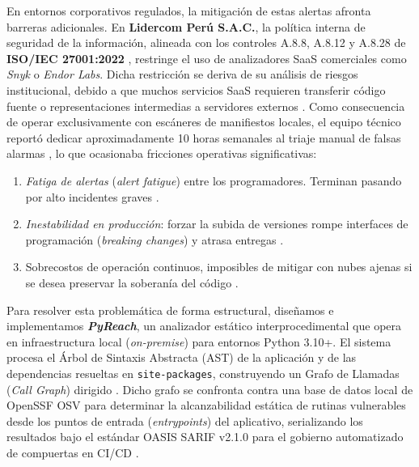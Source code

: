 \documentclass[conference]{IEEEtran}
\begin{document}
En entornos corporativos regulados, la mitigación de estas alertas afronta barreras adicionales. En \textbf{Lidercom Perú S.A.C.}, la política interna de seguridad de la información, alineada con los controles A.8.8, A.8.12 y A.8.28 de \textbf{ISO/IEC 27001:2022} \cite{iso2022sec, gutierrez2024auditoria}, restringe el uso de analizadores SaaS comerciales como \textit{Snyk} o \textit{Endor Labs}. Dicha restricción se deriva de su análisis de riesgos institucional, debido a que muchos servicios SaaS requieren transferir código fuente o representaciones intermedias a servidores externos \cite{ladisa2023sok, ohm2022sok}. Como consecuencia de operar exclusivamente con escáneres de manifiestos locales, el equipo técnico reportó dedicar aproximadamente 10 horas semanales al triaje manual de falsas alarmas \cite{sadowski2018lessons}, lo que ocasionaba fricciones operativas significativas:
\begin{enumerate}
    \item \textit{Fatiga de alertas} (\textit{alert fatigue}) entre los programadores. Terminan pasando por alto incidentes graves \cite{johnson2013developers}.
    \item \textit{Inestabilidad en producción}: forzar la subida de versiones rompe interfaces de programación (\textit{breaking changes}) y atrasa entregas \cite{bogart2016break, xavier2017historical}.
    \item Sobrecostos de operación continuos, imposibles de mitigar con nubes ajenas si se desea preservar la soberanía del código \cite{ladisa2023sok}.
\end{enumerate}

Para resolver esta problemática de forma estructural, diseñamos e implementamos \textbf{\textit{PyReach}}, un analizador estático interprocedimental que opera en infraestructura local (\textit{on-premise}) para entornos Python 3.10+. El sistema procesa el Árbol de Sintaxis Abstracta (AST) de la aplicación y de las dependencias resueltas en \texttt{site-packages}, construyendo un Grafo de Llamadas (\textit{Call Graph}) dirigido \cite{salis2021pycg, ryder1979constructing}. Dicho grafo se confronta contra una base de datos local de OpenSSF OSV \cite{openssf2023osv} para determinar la alcanzabilidad estática de rutinas vulnerables desde los puntos de entrada (\textit{entrypoints}) del aplicativo, serializando los resultados bajo el estándar OASIS SARIF v2.1.0 \cite{oasis2019sarif} para el gobierno automatizado de compuertas en CI/CD \cite{humble2010continuous}.
\end{document}
